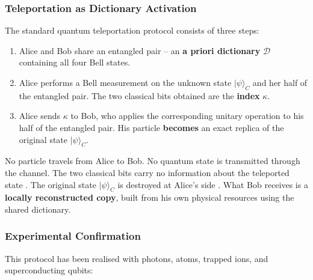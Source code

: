 \documentclass[12pt,a4paper]{article}
\theoremstyle{remark}
\begin{document}
	\subsubsection{Teleportation as Dictionary Activation}
	
	The standard quantum teleportation protocol \cite{Bennett1993} consists of three steps:
	\begin{enumerate}
		\item Alice and Bob share an entangled pair -- an \textbf{a priori dictionary}
		$\mathcal{D}$ containing all four Bell states.
		\item Alice performs a Bell measurement on the unknown state $|\psi\rangle_C$ and her
		half of the entangled pair. The two classical bits obtained are the
		\textbf{index} $\kappa$.
		\item Alice sends $\kappa$ to Bob, who applies the corresponding unitary operation to
		his half of the entangled pair. His particle \textbf{becomes} an exact replica of
		the original state $|\psi\rangle_C$.
	\end{enumerate}
	
	No particle travels from Alice to Bob. No quantum state is transmitted through the
	channel. The two classical bits carry no information about the teleported state
	\cite{Pirandola2017}. The original state $|\psi\rangle_C$ is destroyed at Alice's side
	\cite{Wootters1982}. What Bob receives is a \textbf{locally reconstructed copy}, built
	from his own physical resources using the shared dictionary.
	
	\subsubsection{Experimental Confirmation}
	
	This protocol has been realised with photons, atoms, trapped ions, and superconducting
	qubits:
	
\end{document}
